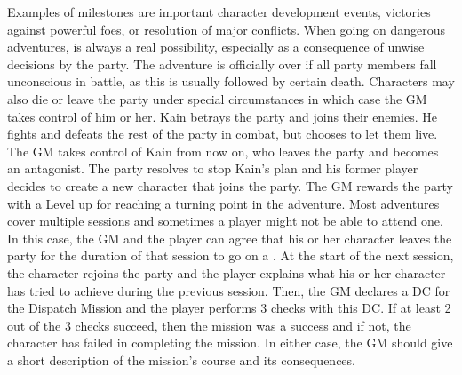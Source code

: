 Examples of milestones are important character development events, victories against powerful foes, or resolution of major conflicts. 
When going on dangerous adventures,  is always a real possibility, especially as a consequence of unwise decisions by the party. 
The adventure is officially over if all party members fall unconscious in battle, as this is usually followed by certain death. 
Characters may also die or leave the party under special circumstances in which case the GM takes control of him or her.
%
\ofpar
%
{
	Kain betrays the party and joins their enemies. 
	He fights and defeats the rest of the party in combat, but chooses to let them live.
	The GM takes control of Kain from now on, who leaves the party and becomes an antagonist.
	The party resolves to stop Kain's plan and his former player decides to create a new character that joins the party. 
	The GM rewards the party with a Level up for reaching a turning point in the adventure.
}
%
\vfill
%
Most adventures cover multiple sessions and sometimes a player might not be able to attend one.
In this case, the GM and the player can agree that his or her character leaves the party for the duration of that session to go on a .
At the start of the next session, the character rejoins the party and the player explains what his or her character has tried to achieve during the previous session.
Then, the GM declares a DC for the Dispatch Mission and the player performs 3 checks with this DC.
If at least 2 out of the 3 checks succeed, then the mission was a success and if not, the character has failed in completing the mission.
In either case, the GM should give a short description of the mission's course and its consequences.
%
\clearpage